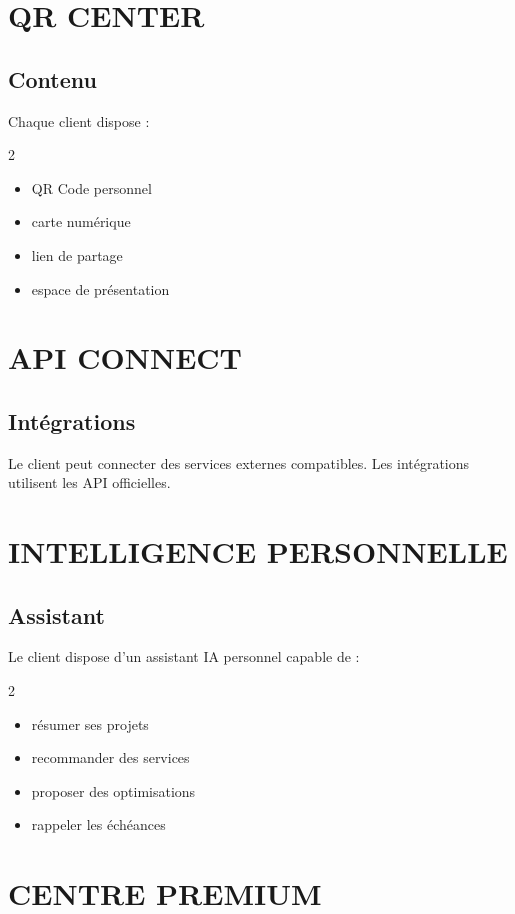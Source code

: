 \documentclass[12pt,a4paper,oneside]{book}
\begin{document}
\chapter{QR CENTER}

\section{Contenu}
Chaque client dispose :
\begin{multicols}{2}
\begin{itemize}
\item QR Code personnel
\item carte numérique
\item lien de partage
\item espace de présentation
\end{itemize}
\end{multicols}

\chapter{API CONNECT}

\section{Intégrations}
Le client peut connecter des services externes compatibles. Les intégrations utilisent les API officielles.

\chapter{INTELLIGENCE PERSONNELLE}

\section{Assistant}
Le client dispose d'un assistant IA personnel capable de :
\begin{multicols}{2}
\begin{itemize}
\item résumer ses projets
\item recommander des services
\item proposer des optimisations
\item rappeler les échéances
\end{itemize}
\end{multicols}

\chapter{CENTRE PREMIUM}
\end{document}
